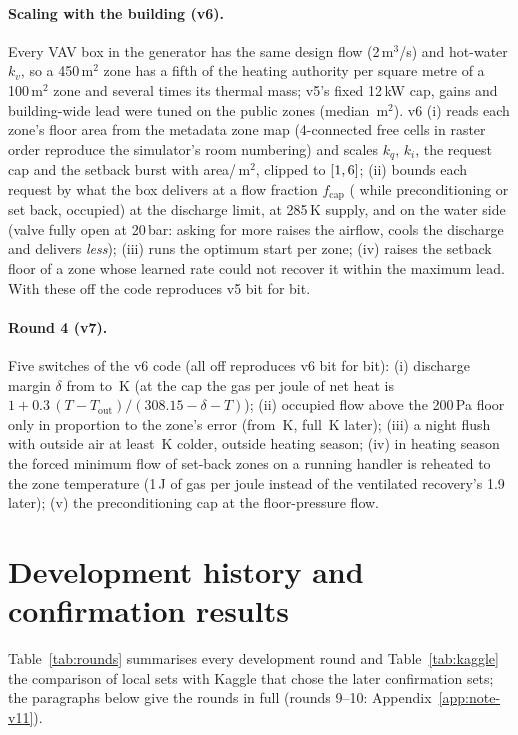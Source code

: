 \documentclass{article}
\begin{document}
\paragraph{Scaling with the building (v6).}
Every VAV box in the generator has the same design flow (2\,m$^3$/s) and hot-water $k_v$, so
a 450\,m$^2$ zone has a fifth of the heating authority per square metre of a 100\,m$^2$ zone
and several times its thermal mass; v5's fixed 12\,kW cap, gains and building-wide lead were
tuned on the public zones (median \PubZoneAreaMedian\,m$^2$). v6 (i) reads each zone's floor
area from the metadata zone map (4-connected free cells in raster order reproduce the
simulator's room numbering) and scales $k_q$, $k_i$, the request cap and the setback burst with
area/\ParAreaRef\,m$^2$, clipped to $[1, 6]$; (ii) bounds each
request by what the box delivers at a flow fraction $f_{\text{cap}}$ (\VSixFCapPre{} while
preconditioning or set back, \ParFCapOcc{} occupied) at the discharge limit, at 285\,K supply,
and on the water side (valve fully open at 20\,bar: asking for more raises the airflow, cools
the discharge and delivers \emph{less}); (iii) runs the optimum start per zone; (iv) raises the
setback floor of a zone whose learned rate could not recover it within the maximum lead. With
these off the code reproduces v5 bit for bit.

\paragraph{Round 4 (v7).}
\label{sec:v7}
Five switches of the v6 code (all off reproduces v6 bit for bit): (i) discharge margin $\delta$ from
\VSixDischMargin{} to \ParRFDischMargin\,K (at the cap the gas per joule of net heat is
$1 + 0.3\,(T - T_{\text{out}})/(308.15 - \delta - T)$); (ii) occupied flow above the 200\,Pa floor only in
proportion to the zone's error (from \ParRFOccEzero\,K, full \ParRFOccSpan\,K later); (iii) a night flush with
outside air at least \ParRFFlushDt\,K colder, outside heating season; (iv) in heating season the forced minimum
flow of set-back zones on a running handler is reheated to the zone temperature (1\,J of gas per joule instead
of the ventilated recovery's 1.9 later); (v) the preconditioning cap at the floor-pressure flow.

\section{Development history and confirmation results}
\label{app:rounds}
Table~\ref{tab:rounds} summarises every development round and Table~\ref{tab:kaggle} the comparison of local sets with Kaggle that chose the later confirmation sets; the paragraphs below give the rounds in full (rounds 9--10: Appendix~\ref{app:note-v11}).


\end{document}
